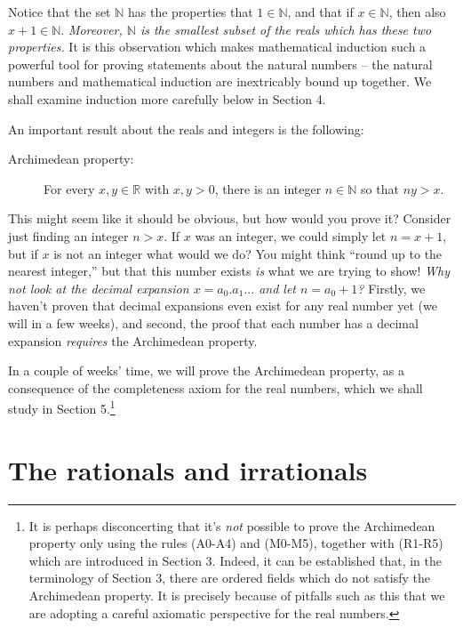 \documentclass[11pt,dvipsnames]{book}
\numberwithin{figure}{section} %
\numberwithin{table}{section} %
\begin{document}
Notice that the set $\mathbb{N}$ has the properties that $1 \in \mathbb{N}$, and that if $x \in \mathbb{N}$, then also $x+1 \in \mathbb{N}$. {\em Moreover, $\mathbb{N}$ is the smallest subset of the reals which has these two properties.} It is this observation which makes mathematical induction such a powerful tool for proving statements about the natural numbers -- the natural numbers and mathematical induction are inextricably bound up together. We shall examine induction more carefully below in Section 4.

\medskip
An important result about the reals and integers is the following:

\begin{description}
\item[Archimedean property:] For every $x, y \in \mathbb{R}$ with $x,y>0$, there is an integer $n\in \mathbb{N}$ so that $ny>x$. \\
\end{description}

This might seem like it should be obvious, but how would you prove it? Consider just finding an integer $n>x$. If $x$ was an integer, we could simply let $n=x+1$, but if $x$ is not an integer what would we do? You might think ``round up to the nearest integer,'' but that this number exists {\it is} what we are trying to show! {\it Why not look at the decimal expansion $x=a_{0}.a_{1}...$ and let $n=a_0+1$?} Firstly, we haven't proven that decimal expansions even exist for any real number yet (we will in a few weeks), and second, the proof that each number has a decimal expansion {\it requires} the Archimedean property.

In a couple of weeks' time, we will prove the Archimedean property, as a consequence of the completeness axiom for the real numbers, which we shall study in Section 5.\footnote{It is perhaps disconcerting that it's {\em not} possible to prove the Archimedean property only using the rules (A0-A4) and (M0-M5), together with (R1-R5) which are introduced in Section 3. Indeed, it can be established that, in the terminology of Section 3, there are ordered fields which do not satisfy the Archimedean property. It is precisely because of pitfalls such as this that we are adopting a careful axiomatic perspective for the real numbers.}

\section{The rationals and irrationals}%
\label{rationals}
\end{document}
